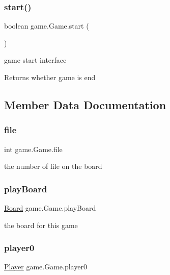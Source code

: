 \subsubsection{\texorpdfstring{start()}{start()}}
{\footnotesize\ttfamily boolean game.\+Game.\+start (\begin{DoxyParamCaption}{ }\end{DoxyParamCaption})\hspace{0.3cm}{\ttfamily [inline]}}

game start interface \begin{DoxyReturn}{Returns}
whether game is end 
\end{DoxyReturn}


\subsection{Member Data Documentation}
\mbox{\label{classgame_1_1_game_ae0ed20be94f9ee5b87550ae2576ce891}} 
\subsubsection{\texorpdfstring{file}{file}}
{\footnotesize\ttfamily int game.\+Game.\+file}

the number of file on the board \mbox{\label{classgame_1_1_game_ae5a12a35960e274e9eac5ac382beb1b3}} 
\subsubsection{\texorpdfstring{play\+Board}{playBoard}}
{\footnotesize\ttfamily \mbox{\hyperlink{classgame_1_1_board}{Board}} game.\+Game.\+play\+Board}

the board for this game \mbox{\label{classgame_1_1_game_a28888dea5fdb92292566492315e4d27b}} 
\subsubsection{\texorpdfstring{player0}{player0}}
{\footnotesize\ttfamily \mbox{\hyperlink{classgame_1_1_player}{Player}} game.\+Game.\+player0}

